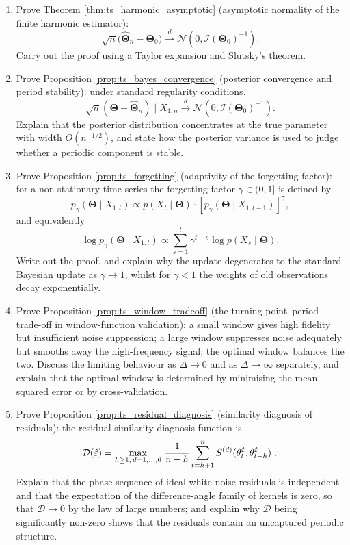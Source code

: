 \begin{enumerate}[leftmargin=3em, label=\textbf{Exercise \arabic*}]
    \item Prove Theorem \ref{thm:ts_harmonic_asymptotic} (asymptotic normality of the finite harmonic estimator):
    \[
    \sqrt{n}\bigl(\hat{\boldsymbol{\Theta}}_n-\boldsymbol{\Theta}_0\bigr)
    \xrightarrow{d}\mathcal{N}(0,\mathcal{I}(\boldsymbol{\Theta}_0)^{-1}).
    \]
    Carry out the proof using a Taylor expansion and Slutsky's theorem.

    \item Prove Proposition \ref{prop:ts_bayes_convergence} (posterior convergence and period stability):
    under standard regularity conditions,
    \[
    \sqrt{n}(\boldsymbol{\Theta}-\hat{\boldsymbol{\Theta}}_n)\mid X_{1:n}
    \xrightarrow{d}\mathcal{N}(0,\mathcal{I}(\boldsymbol{\Theta}_0)^{-1}).
    \]
    Explain that the posterior distribution concentrates at the true parameter with width $O(n^{-1/2})$,
    and state how the posterior variance is used to judge whether a periodic component is stable.

    \item Prove Proposition \ref{prop:ts_forgetting} (adaptivity of the forgetting factor):
    for a non-stationary time series the forgetting factor $\gamma\in(0,1]$ is defined by
    \[
    p_\gamma(\boldsymbol{\Theta}\mid X_{1:t})\propto
    p(X_t\mid\boldsymbol{\Theta})\cdot
    [p_\gamma(\boldsymbol{\Theta}\mid X_{1:t-1})]^\gamma,
    \]
    and equivalently
    \[
    \log p_\gamma(\boldsymbol{\Theta}\mid X_{1:t})\propto
    \sum_{s=1}^t\gamma^{t-s}\log p(X_s\mid\boldsymbol{\Theta}).
    \]
    Write out the proof, and explain why the update degenerates to the standard Bayesian update as $\gamma\to1$,
    whilst for $\gamma<1$ the weights of old observations decay exponentially.

    \item Prove Proposition \ref{prop:ts_window_tradeoff} (the turning-point--period trade-off in window-function validation):
    a small window gives high fidelity but insufficient noise suppression;
    a large window suppresses noise adequately but smooths away the high-frequency signal;
    the optimal window balances the two.
    Discuss the limiting behaviour as $\Delta\to0$ and as $\Delta\to\infty$ separately,
    and explain that the optimal window is determined by minimising the mean squared error or by cross-validation.

    \item Prove Proposition \ref{prop:ts_residual_diagnosis} (similarity diagnosis of residuals):
    the residual similarity diagnosis function is
    \[
    \mathcal{D}(\hat{\varepsilon})=\max_{h\ge1,\,d=1,\dots,6}
    \Bigl|\frac{1}{n-h}\sum_{t=h+1}^n
    S^{(d)}(\theta_t^{\hat{\varepsilon}},
    \theta_{t-h}^{\hat{\varepsilon}})\Bigr|.
    \]
    Explain that the phase sequence of ideal white-noise residuals is independent
    and that the expectation of the difference-angle family of kernels is zero, so that $\mathcal{D}\to0$ by the law of large numbers;
    and explain why $\mathcal{D}$ being significantly non-zero shows that the residuals contain an uncaptured periodic structure.


\end{enumerate}
